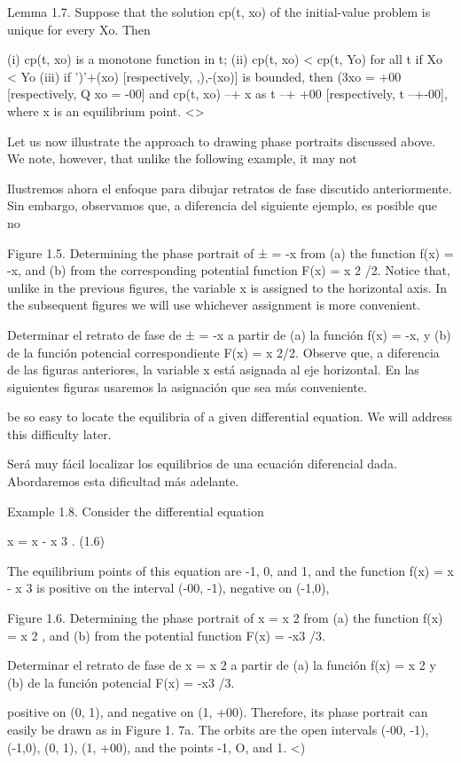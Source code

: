 \documentclass[]{article}
\begin{document}
{Lemma 1.7. Suppose that the solution cp(t, xo) of the initial-value problem is unique for every Xo. Then

(i) cp(t, xo) is a monotone function in t;
(ii) cp(t, xo) < cp(t, Yo) for all t if Xo < Yo
(iii) if ')'+(xo) [respectively, ,),-(xo)] is bounded, then (3xo = +00 [respectively, Q xo = -00] and cp(t, xo) --+ x as t --+ +00 [respectively, t --+-00], where x is an equilibrium point. <>

Let us now illustrate the approach to drawing phase portraits discussed above. We note, however, that unlike the following example, it may not

Ilustremos ahora el enfoque para dibujar retratos de fase discutido anteriormente. Sin embargo, observamos que, a diferencia del siguiente ejemplo, es posible que no


Figure 1.5. Determining the phase portrait of ± = -x from (a) the function f(x) = -x, and (b) from the corresponding potential function F(x) = x 2 /2. Notice that, unlike in the previous figures, the variable x is assigned to the horizontal axis. In the subsequent figures we will use whichever assignment is more convenient. 

Determinar el retrato de fase de ± = -x a partir de (a) la función f(x) = -x, y (b) de la función potencial correspondiente F(x) = x 2/2. Observe que, a diferencia de las figuras anteriores, la variable x está asignada al eje horizontal. En las siguientes figuras usaremos la asignación que sea más conveniente.

be so easy to locate the equilibria of a given differential equation. We will address this difficulty later.

Será muy fácil localizar los equilibrios de una ecuación diferencial dada. Abordaremos esta dificultad más adelante.

Example 1.8. Consider the differential equation

x = x - x 3 . (1.6)

The equilibrium points of this equation are -1, 0, and 1, and the function f(x) = x - x 3 is positive on the interval (-00, -1), negative on (-1,0),


Figure 1.6. Determining the phase portrait of x = x 2 from (a) the function f(x) = x 2 , and (b) from the potential function F(x) = -x3 /3.

Determinar el retrato de fase de x = x 2 a partir de (a) la función f(x) = x 2 y (b) de la función potencial F(x) = -x3 /3.

positive on (0, 1), and negative on (1, +00). Therefore, its phase portrait can easily be drawn as in Figure 1. 7a. The orbits are the open intervals (-00, -1), (-1,0), (0, 1), (1, +00), and the points {-1}, {O}, and {1}. <)

}
\end{document}
